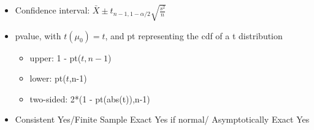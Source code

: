 \documentclass[12pt]{article}
\begin{document}
\begin{note}
\begin{field}
\begin{itemize}
              \item Confidence interval: $\bar{X} \pm t_{n-1,1-\alpha/2}\sqrt{\frac{s^2}{n}}$
              \item pvalue, with $t(\mu_0)  = t$, and pt representing the cdf of a t distribution
              \begin{itemize}
                \item upper: 1 - pt($t,n-1$)
                \item lower: pt($t$,n-1)
                \item two-sided: 2*(1 - pt(abs(t)),n-1)
              \end{itemize}
              \item Consistent Yes/Finite Sample Exact Yes if normal/ Asymptotically Exact Yes
            \end{itemize}
    \end{field}
\end{note}
\end{document}
